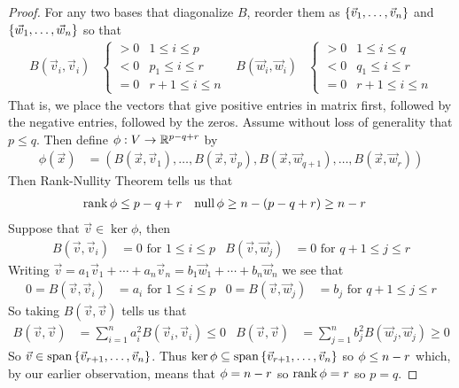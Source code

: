 \begin{proof}
  For any two bases that diagonalize $B$, reorder them as $\left\{\vec v_1,\ldots, \vec v_n\right\}$ and $\left\{\vec w_1,\ldots,\vec w_n\right\}$ so that
  \begin{align}
    B(\vec v_i,\vec v_i) &\begin{cases}
      > 0 & 1 \le i \le p \\
      < 0 & p_1 \le i \le r \\
      = 0 & r+1 \le i \le n
    \end{cases} &
    B(\vec w_i,\vec w_i) &\begin{cases}
      > 0 & 1 \le i \le q \\
      < 0 & q_1 \le i \le r \\
      = 0 & r+1 \le i \le n
    \end{cases}
  \end{align}
  That is, we place the vectors that give positive entries in matrix first, followed by the negative entries, followed by the zeros.
  Assume without loss of generality that $p \le q$. Then define $\phi : V \to \mathbb{R}^{p-q+r}$ by
  \begin{align}
    \phi(\vec x) &= (B(\vec x, \vec v_1),\ldots,B(\vec x, \vec v_p),B(\vec x, \vec w_{q+1}),\ldots,B(\vec x, \vec w_r))
  \end{align}
  Then Rank-Nullity Theorem tells us that
  \begin{align}
    \operatorname{rank} \phi &\le p-q + r & \operatorname{null} \phi &\ge n-(p-q+r) \ge n-r
  \end{align}
  Suppose that $\vec v \in \ker \phi$, then
  \begin{align}
    B(\vec v, \vec v_i) &= 0 \text{ for } 1 \le i \le p &
    B(\vec v, \vec w_j) &= 0 \text{ for } q+1 \le j \le r
  \end{align}
  Writing $\vec v = a_1\vec v_1 + \cdots + a_n\vec v_n = b_1\vec w_1 + \cdots + b_n \vec w_n$ we see that
  \begin{align}
    0 = B(\vec v, \vec v_i) &= a_i \text{ for } 1 \le i \le p &
    0 = B(\vec v, \vec w_j) &= b_j \text{ for } q+1 \le j \le r
  \end{align}
  So taking $B(\vec v, \vec v)$ tells us that
  \begin{align}
    B(\vec v, \vec v) &= \sum_{i=1}^n a_i^2B(\vec v_i, \vec v_i) \le 0 &
    B(\vec v, \vec v) &= \sum_{j=1}^n b_j^2B(\vec w_j, \vec w_j) \ge 0
  \end{align}
  So $\vec v \in \text{span}\left\{\vec v_{r+1},\ldots,\vec v_n\right\}$. Thus $\ker \phi \subseteq \text{span}\left\{\vec v_{r+1},\ldots,\vec v_n\right\}$
  so $\null \phi \le n-r$ which, by our earlier observation, means that $\null \phi = n-r$ so $\operatorname{rank} \phi = r$ so $p=q$.
\end{proof}


